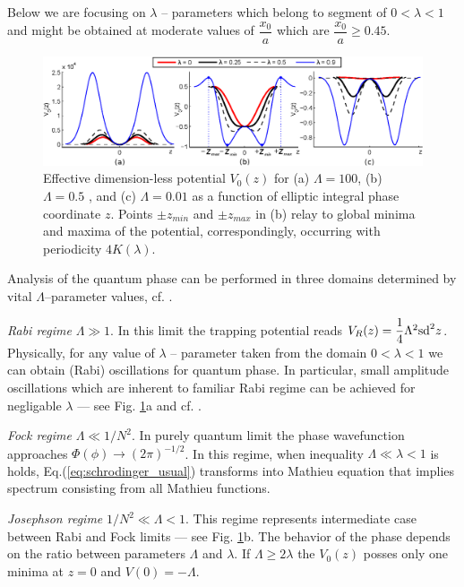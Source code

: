 \documentclass[aps, pre, preprint, groupedaddress, superscriptaddress, showkeys, showpacs] {revtex4-1}
\DeclarePairedDelimiter\ket{\lvert}{\rangle}
\newcommand{\red}{\color{red}}
\begin{document}
Below we are focusing on $\lambda$ -- parameters which belong to segment of $0 < \lambda < 1$ and might be obtained at moderate values of $\dfrac{x_0}{a}$ which are $\dfrac{x_0}{a} \geq 0.45$. 

%
\begin{figure}[ht]
\begin{center}\includegraphics[width=1\linewidth]{pic/potentials.eps}
\end{center}
\caption{
Effective dimension-less potential $V_0(z)$ for (a) $\Lambda = 100$, (b) $\Lambda = 0.5$ , and (c) $\Lambda = 0.01$ as a function of elliptic integral phase coordinate $z$.
Points $\pm z_{min}$ and $\pm z_{max}$ in (b) relay to global minima and maxima of the potential, correspondingly, occurring with periodicity $4K(\lambda)$. \label{phase_potential}}
\end{figure}
%
Analysis of the quantum phase can be performed  in three domains determined by vital $\Lambda$--parameter values, cf. \cite{Anglin}.

\textit{Rabi regime} $\Lambda \gg 1$. In this limit the trapping potential reads $V_R(z) = \dfrac{1}{4} \Lambda^2 \textrm{sd}^2{z}$.
Physically, for any value of $\lambda$ -- parameter taken from the domain 0$<\lambda <1$ we can obtain (Rabi) oscillations for quantum phase.
In particular, small amplitude oscillations which are inherent to familiar Rabi regime can be achieved for negligable $\lambda$ --- see Fig. \ref{phase_potential}a and cf. \cite{Anglin}.

\textit{Fock regime} $\Lambda \ll 1/N^2$.
In purely quantum limit 
the phase wavefunction approaches $\Phi(\phi) \to (2\pi)^{-1/2}$.
In this regime, when inequality $\Lambda \ll \lambda < 1$ is holds, Eq.(\ref{eq:schrodinger_usual}) transforms into Mathieu equation that implies spectrum consisting from all Mathieu functions.

\textit{Josephson regime} $1/N^2\ll\Lambda <1$.
This regime represents intermediate case between Rabi and Fock limits --- see Fig. \ref{phase_potential}b.
The behavior of the phase depends on the ratio between parameters $\Lambda$ and $\lambda$.
If $\Lambda \ge 2\lambda$ the $V_0(z)$ posses only one minima at $z = 0$ and $V(0) = -\Lambda$. 
\end{document}
